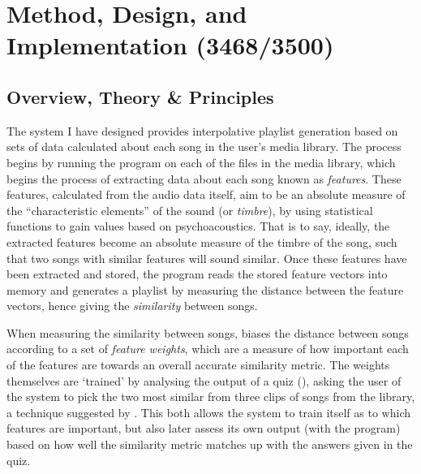 \chapter{Method, Design, and Implementation (3468/3500)}
\section{Overview, Theory \& Principles}
The system I have designed provides interpolative playlist generation based on sets of data calculated about each song in the user's media library. The process begins by running the  program on each of the files in the media library, which begins the process of extracting data about each song known as \emph{features}. These features, calculated from the audio data itself, aim to be an absolute measure of the ``characteristic elements'' \citep{Fingerhut2004} of the sound (or \emph{timbre}), by using statistical functions to gain values based on psychoacoustics. That is to say, ideally, the extracted features become an absolute measure of the timbre of the song, such that two songs with similar features will sound similar. Once these features have been extracted and stored, the  program reads the stored feature vectors into memory and generates a playlist by measuring the distance between the feature vectors, hence giving the \emph{similarity} between songs.

When measuring the similarity between songs,  biases the distance between songs according to a set of \emph{feature weights}, which are a measure of how important each of the features are towards an overall accurate similarity metric. The weights themselves are `trained' by analysing the output of a quiz (), asking the user of the system to pick the two most similar from three clips of songs from the library, a technique suggested by \citet*{Novello2006}. This both allows the system to train itself as to which features are important, but also later assess its own output (with the  program) based on how well the similarity metric matches up with the answers given in the quiz.

